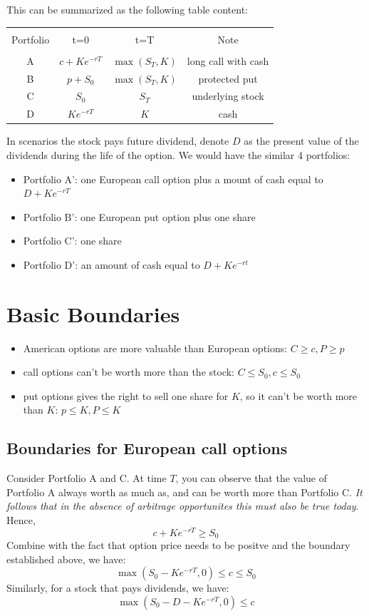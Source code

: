 \documentclass{article}
\begin{document}
This can be summarized as the following table content:

\begin{tabular}{c c c c}
    \hline \\
    Portfolio & t=0 & t=T & Note \\
    \hline \\
    A & \(c + Ke^{-rT}\) & \(\max(S_T, K)\) & long call with cash \\
    B & \(p + S_0\) & \(\max(S_T, K)\) & protected put \\
    C & $S_0$ & $S_T$ & underlying stock \\
    D & \(Ke^{-rT}\) & $K$ & cash \\
    \hline
\end{tabular}

In scenarios the stock pays future dividend, denote $D$ as the present 
value of the dividends during the life of the option. We would have the
similar 4 portfolios:
\begin{itemize}
    \item Portfolio A': one European call option plus a mount of cash equal to \(D+Ke^{-rT}\)
    \item Portfolio B': one European put option plus one share	    
    \item Portfolio C': one share
    \item Portfolio D': an amount of cash equal to \(D+Ke^{-rt}\)
\end{itemize}

\section{Basic Boundaries}
\begin{itemize}
    \item American options are more valuable than European options: 
    \(C \ge c, P \ge p\)
    \item call options can't be worth more than the stock: 
    \(C \le S_0, c \le S_0\)
    \item put options gives the right to sell one share for $K$, 
    so it can't be worth more than $K$: 
    \(p \le K, P \le K\)	    
\end{itemize}

\subsection{Boundaries for European call options}
Consider Portfolio A and C. At time $T$, you can observe that the
value of Portfolio A always worth as much as, and can be worth more than
Portfolio C. \textit{It follows that in the absence of arbitrage opportunites this
must also be true today}. Hence,
\[
c + Ke^{-rT} \ge S_0
\]
Combine with the fact that option price needs to be positve and the boundary 
established above, we have:
\[
\max(S_0 - Ke^{-rT}, 0) \le c \le S_0
\]
Similarly, for a stock that pays dividends, we have:
\[
\max(S_0 - D - Ke^{-rT}, 0) \le c
\]
\end{document}
